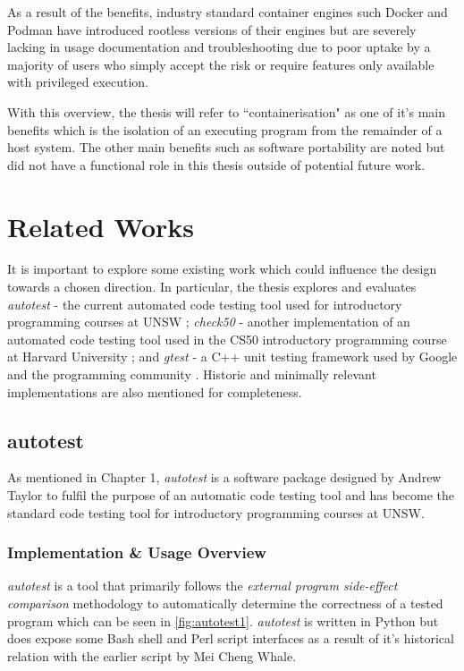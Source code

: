 \documentclass[hidelinks]{report}
\newcommand{\unchapter}[2]{
    \setcounter{chapter}{#1}
    \setcounter{section}{0}
    \chapter*{#2}
    \addcontentsline{toc}{chapter}{#2}
}
\begin{document}
As a result of the benefits, industry standard container engines such Docker and Podman have introduced rootless versions of their engines but are severely lacking in usage documentation and troubleshooting due to poor uptake by a majority of users who simply accept the risk or require features only available with privileged execution.

With this overview, the thesis will refer to ``containerisation" as one of it's main benefits which is the isolation of an executing program from the remainder of a host system. The other main benefits such as software portability are noted but did not have a functional role in this thesis outside of potential future work.

\unchapter{3}{Related Works}

It is important to explore some existing work which could influence the design towards a chosen direction. In particular, the thesis explores and evaluates \textit{autotest} - the current automated code testing tool used for introductory programming courses at UNSW \cite{Autotest}; \textit{check50} - another implementation of an automated code testing tool used in the CS50 introductory programming course at Harvard University \cite{check50}; and \textit{gtest} - a C++ unit testing framework used by Google and the programming community \cite{gtest}. Historic and minimally relevant implementations are also mentioned for completeness. 

\section{autotest}

As mentioned in Chapter 1, \textit{autotest} is a software package designed by Andrew Taylor to fulfil the purpose of an automatic code testing tool and has become the standard code testing tool for introductory programming courses at UNSW.

\subsection{Implementation \& Usage Overview}

\textit{autotest} is a tool that primarily follows the \textit{external program side-effect comparison} methodology to automatically determine the correctness of a tested program which can be seen in \autoref{fig:autotest1}. \textit{autotest} is written in Python but does expose some Bash shell and Perl script interfaces as a result of it's historical relation with the earlier script by Mei Cheng Whale.
\end{document}
